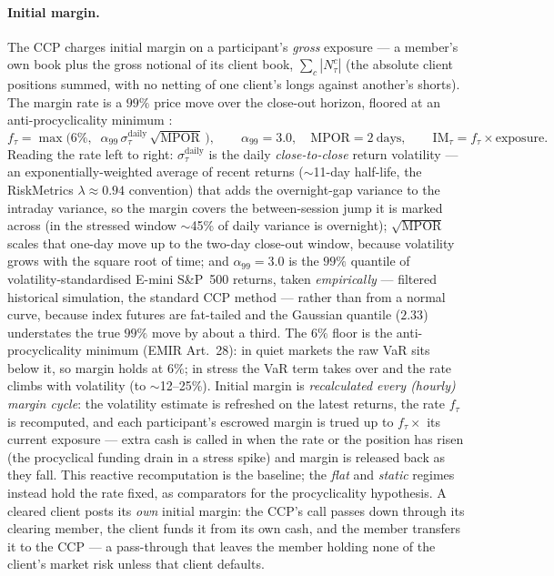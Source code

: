 \paragraph{Initial margin.}
The CCP charges initial margin on a participant's \emph{gross} exposure --- a member's own book plus
the gross notional of its client book, $\sum_c |N^c_\tau|$ (the absolute client positions summed, with
no netting of one client's longs against another's shorts). The margin rate is a $99\%$ price move over
the close-out horizon, floored at an anti-procyclicality minimum \citep{emir_rts}:
\begin{equation}
\label{eq:im}
f_\tau = \max\!\bigl(6\%,\;\; \alpha_{99}\,\sigma^{\mathrm{daily}}_\tau\,\sqrt{\mathrm{MPOR}}\,\bigr),
\qquad \alpha_{99} = 3.0,\quad \mathrm{MPOR} = 2\ \text{days},
\qquad \mathrm{IM}_\tau = f_\tau \times \text{exposure}.
\end{equation}
Reading the rate left to right: $\sigma^{\mathrm{daily}}_\tau$ is the daily \emph{close-to-close}
return volatility --- an exponentially-weighted average of recent returns ($\sim$11-day half-life, the
RiskMetrics $\lambda\approx0.94$ convention) that adds the overnight-gap variance to the intraday
variance, so the margin covers the between-session jump it is marked across (in the stressed window
$\sim$45\% of daily variance is overnight); $\sqrt{\mathrm{MPOR}}$ scales that one-day move up to the two-day
close-out window, because volatility grows with the square root of time; and $\alpha_{99}=3.0$ is the
$99\%$ quantile of volatility-standardised E-mini S\&P~500 returns, taken \emph{empirically} ---
filtered historical simulation, the standard CCP method --- rather than from a normal curve, because
index futures are fat-tailed and the Gaussian quantile ($2.33$) understates the true $99\%$ move by
about a third. The $6\%$ floor is the anti-procyclicality minimum (EMIR Art.~28): in quiet markets the
raw VaR sits below it, so margin holds at $6\%$; in stress the VaR term takes over and the rate climbs
with volatility (to $\sim$12--25\%). Initial margin is \emph{recalculated every (hourly) margin
cycle}: the volatility estimate is refreshed on the latest returns, the rate $f_\tau$ is recomputed,
and each participant's escrowed margin is trued up to $f_\tau \times$ its current exposure --- extra
cash is called in when the rate or the position has risen (the procyclical funding drain in a stress
spike) and margin is released back as they fall. This reactive recomputation is the baseline; the
\emph{flat} and \emph{static} regimes instead hold the rate fixed, as comparators for the
procyclicality hypothesis. A cleared client posts its \emph{own} initial margin: the CCP's call passes
down through its clearing member, the client funds it from its own cash, and the member transfers it to
the CCP --- a pass-through that leaves the member holding none of the client's market risk unless that
client defaults.


